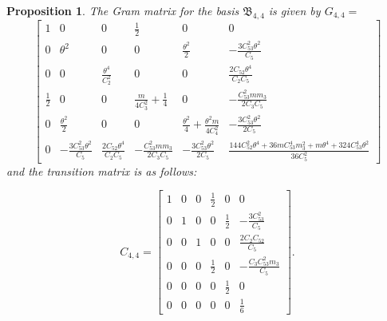 \documentclass[table]{amsart}
\newtheorem{proposition}[theorem]{Proposition}
\numberwithin{equation}{section}
\begin{document}
\begin{proposition}
    The Gram matrix for the basis $\mathfrak{B}_{4, 4}$ is given by $G_{4,4}=$ 
    \[
\begin{bmatrix}
1 & 0 & 0 & \tfrac{1}{2} & 0 & 0 \\[8pt]

0 
& \theta^2 
& 0 
& 0 
& \tfrac{\theta^2}{2 } 
& -\tfrac{3 C_{53}^2 \theta^2}{ C_5} \\[8pt]

0 
& 0 
& \tfrac{\theta^4}{C_2^2} 
& 0 
& 0 
& \tfrac{2 C_{52} \theta^4}{C_2 C_5} \\[8pt]

\tfrac{1}{2} 
& 0 
& 0 
& \tfrac{m}{4 C_3^2} + \tfrac{1}{4} 
& 0 
& -\tfrac{C_{53}^2 m m_3}{2 C_3 C_5} \\[8pt]

0 
& \tfrac{\theta^2}{2 } 
& 0 
& 0 
& \tfrac{\theta^2}{4 } + \tfrac{\theta^2 m}{4 C_4^2} 
& -\tfrac{3 C_{53}^2 \theta^2}{2  C_5} \\[8pt]

0 
& -\tfrac{3 C_{53}^2 \theta^2}{ C_5} 
& \tfrac{2 C_{52} \theta^4}{C_2 C_5} 
& -\tfrac{C_{53}^2 m m_3}{2 C_3 C_5} 
& -\tfrac{3 C_{53}^2 \theta^2}{2  C_5} 
& \tfrac{144  C_{52}^2 \theta^4 + 36 m  C_{53}^4 m_3^2 + m  \theta^4 + 324 C_{53}^4 \theta^2}{36  C_5^2}
\end{bmatrix}
\]
and the transition matrix is as follows:

\[C_{4,4}=
\begin{bmatrix}
1 & 0 & 0 & \tfrac{1}{2} & 0 & 0 \\[8pt]
0 & 1 & 0 & 0 & \tfrac{1}{2} & -\tfrac{3 C_{53}^2}{C_5} \\[8pt]
0 & 0 & 1 & 0 & 0 & \tfrac{2 C_2 C_{52}}{C_5} \\[8pt]
0 & 0 & 0 & \tfrac{1}{2} & 0 & -\tfrac{C_3 C_{53}^2 m_3}{C_5} \\[8pt]
0 & 0 & 0 & 0 & \tfrac{1}{2} & 0 \\[8pt]
0 & 0 & 0 & 0 & 0 & \tfrac{1}{6}
\end{bmatrix}.
\]
\end{proposition}
\end{document}
